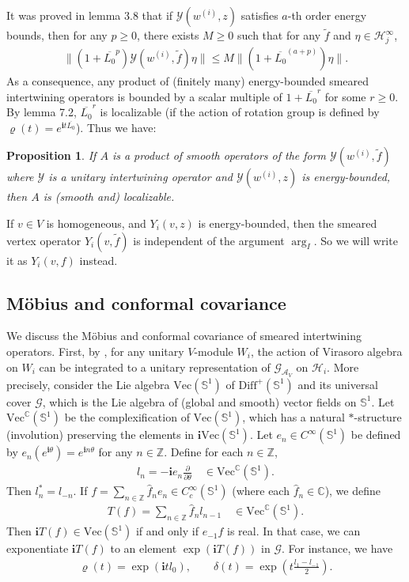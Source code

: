 \documentclass[11pt,b5paper,notitlepage]{article}
\theoremstyle{definition}
\theoremstyle{plain}
\newtheorem{pp}[df]{Proposition}
\newcommand{\mc}{\mathcal}
\newcommand{\wtd}{\widetilde}
\newcommand{\wht}{\widehat}
\newcommand{\ovl}{\overline}
\newcommand{\Diffp}{\mathrm{Diff}^+}
\newcommand{\GAV}{\mathscr G_{\mathcal A_V}}
\newcommand{\Vect}{\mathrm{Vec}}
\newcommand{\Vectc}{\mathrm{Vec}^{\mathbb C}}
\newcommand{\scr}{\mathscr}
\newcommand{\im}{\mathbf{i}}
\newcommand{\mbb}{\mathbb}
\numberwithin{equation}{subsection}
\begin{document}
It was proved in \cite{Gui19a} lemma 3.8 that if $\mc Y(w^{(i)},z)$ satisfies $a$-th order energy bounds, then for any $p\geq0$, there exists $M\geq0$ such that for any $\wtd f$ and $\eta\in\mc H_j^\infty$,
\begin{align*}
\big\lVert (1+\ovl{L_0}^p) \mc Y(w^{(i)},\wtd f)\eta\big\lVert \leq M \big\lVert  (1+\ovl{L_0}^{(a+p)}) \eta\big\lVert.
\end{align*}
As a consequence, any product of (finitely many) energy-bounded smeared intertwining operators is bounded by a scalar multiple of $1+\ovl{L_0}^r$ for some $r\geq0$. By \cite{CKLW18} lemma 7.2, $\ovl{L_0}^r$ is localizable (if the action of rotation group is defined by $\varrho(t)=e^{\im t\ovl{L_0}}$). Thus we have:

\begin{pp}\label{lb45}
If $A$ is a product of smooth operators of the form $\mc Y(w^{(i)},\wtd f)$ where $\mc Y$ is a unitary intertwining operator and $\mc Y(w^{(i)},z)$ is energy-bounded, then $A$ is (smooth and) localizable.
\end{pp}

If $v\in V$ is homogeneous,  and $Y_i(v,z)$ is energy-bounded, then the smeared vertex operator $Y_i(v,\wtd f)$ is independent of the argument $\arg_I$. So we will write it as $Y_i(v,f)$ instead.

\subsection{M\"obius and conformal covariance}

We discuss the M\"obius and conformal covariance of smeared intertwining operators. First, by \cite{TL99}, for any unitary $V$-module $W_i$, the action of Virasoro algebra on $W_i$ can be integrated to a unitary representation of $\GAV$ on $\mc H_i$. More precisely, consider the Lie algebra $\Vect(\mbb S^1)$ of $\Diffp(\mbb S^1)$ and its universal cover $\scr G$, which is the Lie algebra of (global and smooth) vector fields on $\mbb S^1$. Let $\Vectc(\mbb S^1)$ be the complexification of $\Vect(\mbb S^1)$, which has a natural $*$-structure (involution) preserving the elements in $\im\Vect(\mbb S^1)$.  Let $e_n\in C^\infty(\mbb S^1)$ be  defined by $e_n(e^{\im\theta})=e^{\im n\theta}$ for any $n\in\mbb Z$. Define for each $n\in\mbb Z$,
\begin{align*}
l_n=-\im e_n\frac{\partial}{\partial\theta}\quad \in\Vectc(\mbb S^1).
\end{align*}
Then $l_n^*=l_{-n}$. If $f=\sum_{n\in\mbb Z}\wht f_ne_n\in C_c^\infty(\mbb S^1)$ (where each $\wht f_n\in\mbb C$), we define
\begin{align*}
T(f)=\sum_{n\in\mbb Z}\wht f_nl_{n-1}\quad\in\Vectc(\mbb S^1).
\end{align*}
Then $\im T(f)\in\Vect(\mbb S^1)$ if and only if $e_{-1}f$ is real. In that case, we can exponentiate $\im T(f)$ to an element $\exp(\im T(f))$ in $\scr G$. For instance, we have
\begin{gather*}
\varrho(t)=\exp(\im tl_0),\qquad \delta(t)=\exp(t\frac{l_1-l_{-1}}2).
\end{gather*}
\end{document}
